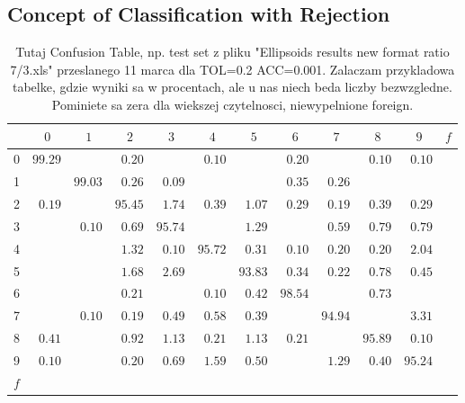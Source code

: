\documentclass{llncs}
\begin{document}

\subsection{Concept of Classification with Rejection}
  \label{subsec:ClassificationAndRejection}


\begin{table}[h]
\centering
\caption{\color{red}Tutaj Confusion Table, np. test set z pliku "Ellipsoids results new format ratio 7/3.xls" przeslanego 11 marca dla TOL=0.2 ACC=0.001. Zalaczam przykladowa tabelke, gdzie wyniki sa w procentach, ale u nas niech beda liczby bezwzgledne. Pominiete sa zera dla wiekszej czytelnosci, niewypelnione foreign.}
\setlength{\tabcolsep}{3pt}
\renewcommand{\arraystretch}{1}
{\small
\begin{tabular}{|c||r|r|r|r|r|r|r|r|r|r|r|}
\hline
 \hspace{15pt} & $0\;\;\;$ & $1\;\;\;$ & $2\;\;\;$ & $3\;\;\;$ & $4\;\;\;$ & $5\;\;\;$ & $6\;\;\;$ & $7\;\;\;$ & $8\;\;\;$ & $9\;\;\;$ & $f$ \\
\hline\hline
  0 & $99.29$ &         & $0.20$  &         & $0.10$  &         & $0.20$  &         & $0.10$  & $0.10$  &  \\
\hline
  1 &         & $99.03$ & $0.26$  & $0.09$  &         &         & $0.35$  & $0.26$  &         &         &  \\
\hline
  2 & $0.19$  &         & $95.45$ & $1.74$  & $0.39$  & $1.07$  & $0.29$  & $0.19$  & $0.39$  & $0.29$  &  \\
\hline
  3 &         & $0.10$  & $0.69$  & $95.74$ &         & $1.29$  &         & $0.59$  & $0.79$  & $0.79$  &  \\
\hline
  4 &         &         & $1.32$  & $0.10$  & $95.72$ & $0.31$  & $0.10$  & $0.20$  & $0.20$  & $2.04$  &  \\
\hline
  5 &         &         & $1.68$  & $2.69$  &         & $93.83$ & $0.34$  & $0.22$  & $0.78$  & $0.45$  &  \\
\hline
  6 &         &         & $0.21$  &         & $0.10$  & $0.42$  & $98.54$ &         & $0.73$  &         &  \\
\hline
  7 &         & $0.10$  & $0.19$  & $0.49$  & $0.58$  & $0.39$  &         & $94.94$ &         & $3.31$  &  \\
\hline
  8 & $0.41$  &         & $0.92$  & $1.13$  & $0.21$  & $1.13$  & $0.21$  &         & $95.89$ & $0.10$  &  \\
\hline
  9 & $0.10$  &         & $0.20$  & $0.69$  & $1.59$  & $0.50$  &         & $1.29$  & $0.40$  & $95.24$ & \\
\hline
$f$ &         &         &         &         &         &         &         &         &         &         & \\
\hline
\end{tabular}
}
\label{tab:CofusionTable}
\end{table}
\end{document}

